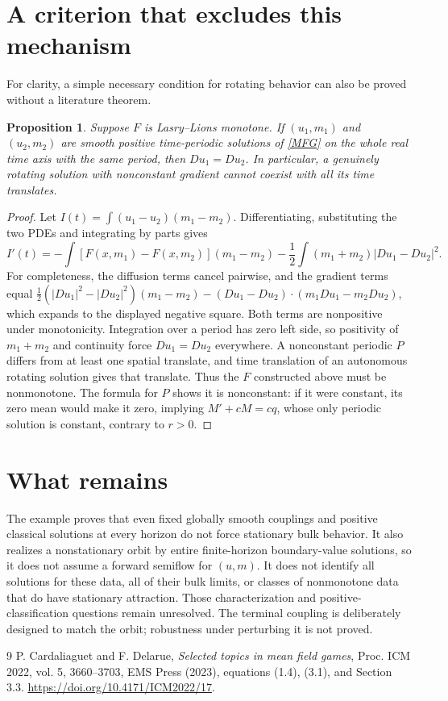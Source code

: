 \documentclass[11pt]{article}
\newtheorem{proposition}[theorem]{Proposition}
\begin{document}
\section{A criterion that excludes this mechanism}
For clarity, a simple necessary condition for rotating behavior can also be proved without a literature theorem.
\begin{proposition}\label{monotone}
Suppose $F$ is Lasry--Lions monotone. If $(u_1,m_1)$ and $(u_2,m_2)$ are smooth positive time-periodic solutions of \eqref{MFG} on the whole real time axis with the same period, then $D u_1=D u_2$. In particular, a genuinely rotating solution with nonconstant gradient cannot coexist with all its time translates.
\end{proposition}
\begin{proof}
Let $I(t)=\int(u_1-u_2)(m_1-m_2)$. Differentiating, substituting the two PDEs and integrating by parts gives
\[
 I'(t)=-\int[F(x,m_1)-F(x,m_2)](m_1-m_2)
       -\frac12\int(m_1+m_2)|Du_1-Du_2|^2.
\]
For completeness, the diffusion terms cancel pairwise, and the gradient terms equal
$\tfrac12(|Du_1|^2-|Du_2|^2)(m_1-m_2)
-(Du_1-Du_2)\cdot(m_1Du_1-m_2Du_2)$,
which expands to the displayed negative square. Both terms are nonpositive under monotonicity. Integration over a period has zero left side, so positivity of $m_1+m_2$ and continuity force $Du_1=Du_2$ everywhere. A nonconstant periodic $P$ differs from at least one spatial translate, and time translation of an autonomous rotating solution gives that translate. Thus the $F$ constructed above must be nonmonotone. The formula for $P$ shows it is nonconstant: if it were constant, its zero mean would make it zero, implying $M'+cM=cq$, whose only periodic solution is constant, contrary to $r>0$.
\end{proof}

\section{What remains}
The example proves that even fixed globally smooth couplings and positive classical solutions at every horizon do not force stationary bulk behavior. It also realizes a nonstationary orbit by entire finite-horizon boundary-value solutions, so it does not assume a forward semiflow for $(u,m)$. It does not identify all solutions for these data, all of their bulk limits, or classes of nonmonotone data that do have stationary attraction. Those characterization and positive-classification questions remain unresolved. The terminal coupling is deliberately designed to match the orbit; robustness under perturbing it is not proved.

\begin{thebibliography}{9}
 P. Cardaliaguet and F. Delarue, \emph{Selected topics in mean field games}, Proc. ICM 2022, vol. 5, 3660--3703, EMS Press (2023), equations (1.4), (3.1), and Section 3.3. \url{https://doi.org/10.4171/ICM2022/17}.
\end{thebibliography}
\end{document}

